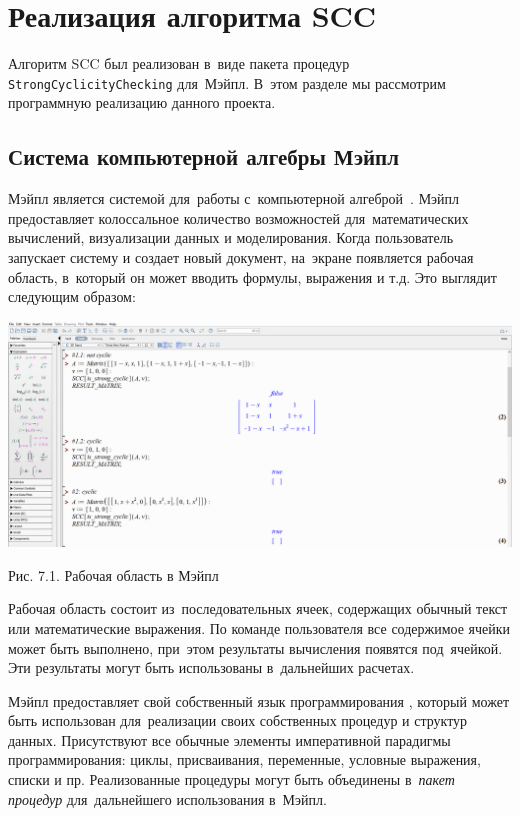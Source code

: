 \section{Реализация алгоритма SCC}

Алгоритм SCC был реализован в~виде пакета процедур \verb|StrongCyclicityChecking| для~Мэйпл.
В~этом разделе мы рассмотрим программную реализацию данного проекта.


\subsection{Система компьютерной алгебры Мэйпл}

Мэйпл является системой для~работы с~компьютерной алгеброй~\cite{litMapleHelp}.
Мэйпл предоставляет колоссальное количество возможностей для~математических вычислений, визуализации данных и моделирования.
Когда пользователь запускает систему и создает новый документ,
на~экране появляется рабочая область, в~который он может вводить формулы, выражения и т.д.
Это выглядит следующим образом:

\begin{center}
    \includegraphics[scale=0.3]{pictures/maple_workarea.png}

    \small
    Рис. 7.1. Рабочая область в Мэйпл
\end{center}

Рабочая область состоит из~последовательных ячеек, содержащих обычный текст или математические выражения.
По команде пользователя все содержимое ячейки может быть выполнено, при~этом результаты вычисления появятся под~ячейкой.
Эти результаты могут быть использованы в~дальнейших расчетах.

Мэйпл предоставляет свой собственный язык программирования \cite{litMapleGuide2011, litMapleGuide2021},
который может быть использован для~реализации своих собственных процедур и структур данных.
Присутствуют все обычные элементы императивной парадигмы программирования:
циклы, присваивания, переменные, условные выражения, списки и пр.
Реализованные процедуры могут быть объединены в~\emph{пакет процедур}
для~дальнейшего использования в~Мэйпл.

